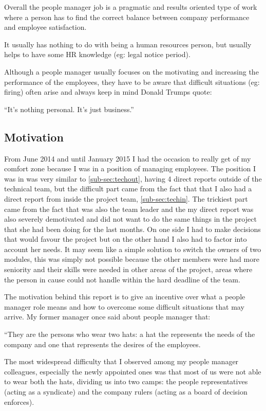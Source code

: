 Overall the people manager job is a pragmatic and results oriented type of work where a person has to find the correct balance between company performance and employee satisfaction.

It usually has nothing to do with being a human resources person, but usually helps to have some HR knowledge (eg: legal notice period). 

Although a people manager usually focuses on the motivating and increasing the performance of the employees, they have to be aware that difficult situations (eg: firing) often arise and always keep in mind Donald Trumps quote:

\begin{displayquote}
``It's nothing personal. It's just business.''
\end{displayquote}

\subsection{Motivation}
\label{sub-sec:Motivation}

From June 2014 and until January 2015 I had the occasion to really get of my comfort zone because I was in a position of managing employees. The position I was in was very similar to \ref{sub-sec:techout}, having 4 direct reports outside of the technical team, but the difficult part came from the fact that that I also had a direct report from inside the project team, \ref{sub-sec:techin}. The trickiest part came from the fact that was also the team leader and the my direct report was also severely demotivated and did not want to do the same things in the project that she had been doing for the last months. On one side I had to make decisions that would favour the project but on the other hand I also had to factor into account her needs. It may seem like a simple solution to switch the owners of two modules, this was simply not possible because the other members were had more seniority and their skills were needed in other areas of the project, areas where the person in cause could not handle within the hard deadline of the team.

The motivation behind this report is to give an incentive over what a people manager role means and how to overcome some difficult situations that may arrive. My former manager once said about people manager that:
\begin{displayquote}
``They are the persons who wear two hats: a hat the represents the needs of the company and one that represents the desires of the employees.
\end{displayquote}
The most widespread difficulty that I observed among my people manager colleagues, especially the newly appointed ones was that most of us were not able to wear both the hats, dividing us into two camps: the people representatives (acting as a syndicate) and the company rulers (acting as a board of decision enforces).

